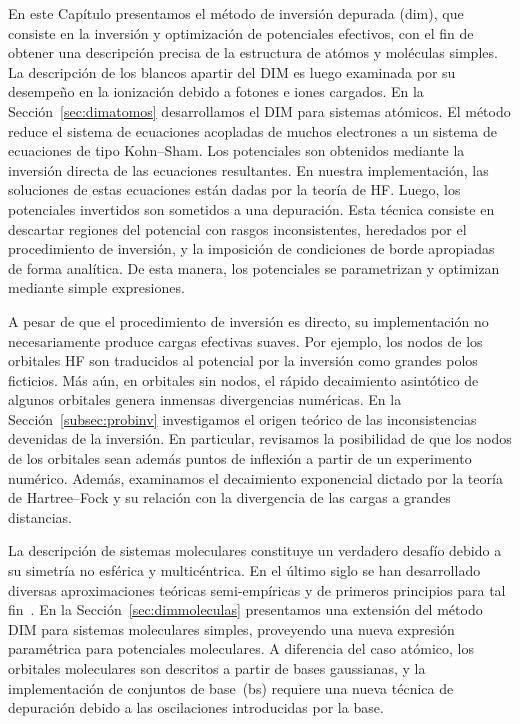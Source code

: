 En este Capítulo presentamos el método de inversión depurada (\acs{dim}),
que consiste en la inversión y optimización de potenciales efectivos, 
con el fin de obtener una descripción precisa de la estructura de atómos 
y moléculas simples. La descripción de los blancos apartir del DIM es 
luego examinada por su desempeño en la ionización debido a fotones e 
iones cargados. En la Sección~\ref{sec:dimatomos} desarrollamos el DIM 
para sistemas atómicos. El método reduce el sistema de ecuaciones 
acopladas de muchos electrones a un sistema de ecuaciones de tipo 
Kohn--Sham. Los potenciales son obtenidos mediante la inversión directa 
de las ecuaciones resultantes. En nuestra implementación, las soluciones 
de estas ecuaciones están dadas por la teoría de HF. Luego, los 
potenciales invertidos son sometidos a una depuración. Esta técnica 
consiste en descartar regiones del potencial con rasgos inconsistentes, 
heredados por el procedimiento de inversión, y la imposición de 
condiciones de borde apropiadas de forma analítica. De esta manera, los 
potenciales se parametrizan y optimizan mediante simple expresiones. 

A pesar de que el procedimiento de inversión es directo, su 
implementación no necesariamente produce cargas efectivas suaves. Por 
ejemplo, los nodos de los orbitales HF son traducidos al potencial por 
la inversión como grandes polos ficticios. Más aún, en orbitales sin 
nodos, el rápido decaimiento asintótico de algunos orbitales genera 
inmensas divergencias numéricas. En la Sección~\ref{subsec:probinv} 
investigamos el origen teórico de las inconsistencias devenidas de la 
inversión. En particular, revisamos la posibilidad de que los nodos de 
los orbitales sean además puntos de inflexión a partir de un experimento 
numérico. Además, examinamos el decaimiento exponencial dictado por la teoría de Hartree--Fock y su relación con la divergencia de las cargas a grandes distancias.

La descripción de sistemas moleculares constituye un verdadero desafío 
debido a su simetría no esférica y multicéntrica. En el último siglo se 
han desarrollado diversas aproximaciones teóricas semi-empíricas y de 
primeros principios para tal fin~\cite{Szabo:96,Helgaker:00,
Schaefer:04}. En la Sección~\ref{sec:dimmoleculas} 
presentamos una extensión del método DIM para sistemas moleculares 
simples, proveyendo una nueva expresión paramétrica para potenciales 
moleculares. A diferencia del caso atómico, los orbitales moleculares 
son descritos a partir de bases gaussianas, y la implementación de 
conjuntos de base~(\acs{bs}) requiere una nueva técnica de depuración 
debido a las oscilaciones introducidas por la base. 

